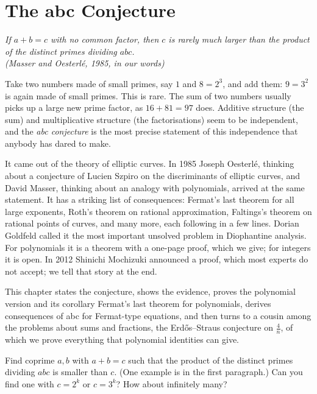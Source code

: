 \chapter{The abc Conjecture}\label{conjectures:ch:abc}

\begin{center}\itshape
If $a+b=c$ with no common factor, then $c$ is rarely much larger than the product of the distinct primes dividing $abc$.\\
\upshape(Masser and Oesterl\'e, 1985, in our words)
\end{center}

Take two numbers made of small primes, say $1$ and $8=2^3$, and add them: $9=3^2$ is again made of small primes. This is rare. The sum of two
numbers usually picks up a large new prime factor, as $16+81=97$ does. Additive structure (the sum) and multiplicative structure (the factorisations)
seem to be independent, and the \emph{abc conjecture} is the most precise statement of this independence that anybody has dared to make.

It came out of the theory of elliptic curves. In 1985 Joseph Oesterl\'e, thinking about a conjecture of Lucien Szpiro on the discriminants of elliptic
curves, and David Masser, thinking about an analogy with polynomials, arrived at the same statement. It has a striking list of consequences: Fermat's
last theorem for all large exponents, Roth's theorem on rational approximation, Faltings's theorem on rational points of curves, and many more, each
following in a few lines. Dorian Goldfeld called it the most important unsolved problem in Diophantine analysis. For polynomials it is a theorem with a
one-page proof, which we give; for integers it is open. In 2012 Shinichi Mochizuki announced a proof, which most experts do not accept; we tell that story
at the end.

This chapter states the conjecture, shows the evidence, proves the polynomial version and its corollary Fermat's last theorem for polynomials, derives
consequences of abc for Fermat-type equations, and then turns to a cousin among the problems about sums and fractions, the Erd\H os--Straus conjecture
on $\frac4n$, of which we prove everything that polynomial identities can give.

\begin{think}
Find coprime $a,b$ with $a+b=c$ such that the product of the distinct primes dividing $abc$ is smaller than $c$. (One example is in the first paragraph.)
Can you find one with $c=2^k$ or $c=3^k$? How about infinitely many?
\end{think}

